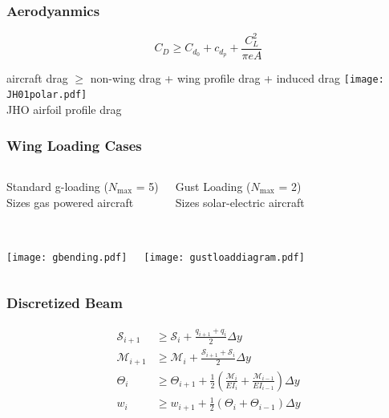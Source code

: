 \documentclass{beamer}
\begin{document}
\begin{frame}
    \frametitle{Aerodyanmics}

    \[ C_D \geq C_{d_0} + c_{d_p} + \frac{C_L^2}{\pi e A} \]

    \begin{center}
    aircraft drag $\geq$ non-wing drag + wing profile drag + induced drag
    \texttt{[image: JH01polar.pdf]} \\
    \scriptsize
    JHO airfoil profile drag
    \end{center}
    
\end{frame}

\begin{frame}
    \frametitle{Wing Loading Cases}
      
    \begin{columns}
        \begin{center}
        Standard g-loading ($N_{\text{max}}$ = 5) \\
        Sizes gas powered aircraft \\~\\
        \end{center}
        
        \begin{center}
        Gust Loading ($N_{\text{max}}$ = 2) \\
        Sizes solar-electric aircraft \\~\\
        \end{center}
    \end{columns}

    \begin{columns}
        \texttt{[image: gbending.pdf]}
        
        \texttt{[image: gustloaddiagram.pdf]}
    \end{columns}
\end{frame}

\begin{frame}
    \frametitle{Discretized Beam}

    \begin{align*}
        \mathcal{S}_{i+1} &\geq \mathcal{S}_i + \frac{q_{i+1} + q_i}{2} \Delta y \\
        \mathcal{M}_{i+1} &\geq \mathcal{M}_i + \frac{\mathcal{S}_{i+1} + \mathcal{S}_i}{2} \Delta y \\
        \Theta_{i} &\geq \Theta_{i+1} + \frac{1}{2} \left(\frac{\mathcal{M}_i}{EI_i} + \frac{\mathcal{M}_{i-1}}{EI_{i-1}} \right) \Delta y \\
        w_{i} &\geq w_{i+1} + \frac{1}{2} (\Theta_i + \Theta_{i-1}) \Delta y 
    \end{align*}
\end{frame}
\end{document}
